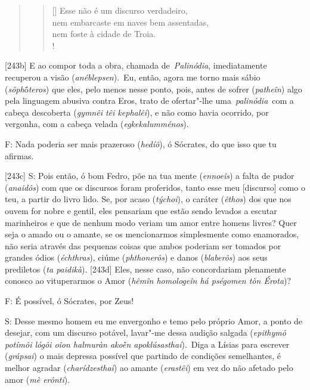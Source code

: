  

\begin{quote}

\begin{verse}[\versewidth]
Esse não é um discurso verdadeiro,\\
 nem embarcaste em naves bem
assentadas,\\
 nem foste à cidade de Troia.\\!
\end{verse} 
\end{quote}

 

[243b] E ao compor toda a obra, chamada de~\emph{Palinódia},
imediatamente recuperou a visão (\emph{anéblepsen}).~Eu, então, agora me
torno mais sábio (\emph{sôph}ṓ\emph{teros}) que eles, pelo menos nesse
ponto, pois, antes de sofrer (\emph{patheîn}) algo pela linguagem
abusiva contra Eros, trato de ofertar"-lhe uma~\emph{palinódia}~com a
cabeça descoberta (\emph{gymnêi têi kephalêi}), e não como havia
ocorrido, por vergonha, com a cabeça velada (\emph{egkekalumménos}).

 

F: Nada poderia ser mais prazeroso (\emph{hedíô}), ó Sócrates, do que
isso que tu afirmas.

 

[243c] S: Pois então, ó bom Fedro, põe na tua mente (\emph{ennoeîs})
a falta de pudor (\emph{anaidôs}) com que os discursos foram proferidos,
tanto esse meu [discurso] como o teu, a partir do livro lido. Se,
por acaso (\emph{týchoi}), o caráter (\emph{êthos}) dos que nos ouvem
for nobre e gentil, eles pensariam que estão sendo levados a escutar
marinheiros e que de nenhum modo veriam um amor entre homens livres?
Quer seja o amado ou o amante, se os mencionarmos simplesmente como
enamorados, não seria através das pequenas coisas que ambos poderiam ser
tomados por grandes ódios (\emph{échthras}), ciúme (\emph{phthonerôs})
e danos (\emph{blaberôs}) aos seus prediletos (\emph{ta paidikà}).
[243d] Eles, nesse caso, não concordariam plenamente conosco ao
vituperarmos o Amor (\emph{hêmîn homologeîn há pségomen tòn Érota})?

 

F: É possível, ó Sócrates, por Zeus!

 

S: Desse mesmo homem eu me envergonho e temo pelo próprio Amor, a ponto
de desejar, com um discurso potável, lavar"-me dessa audição salgada
(\emph{epithymô potímôi lógôi oîon halmuràn akoḕn apoklúsasthai}).~Diga
a Lísias para escrever (\emph{grápsai}) o mais depressa possível que
partindo de condições semelhantes, é melhor agradar
(\emph{charídzesthai}) ao amante (\emph{erastêi}) em vez do não afetado
pelo amor (\emph{mè erônti}).

